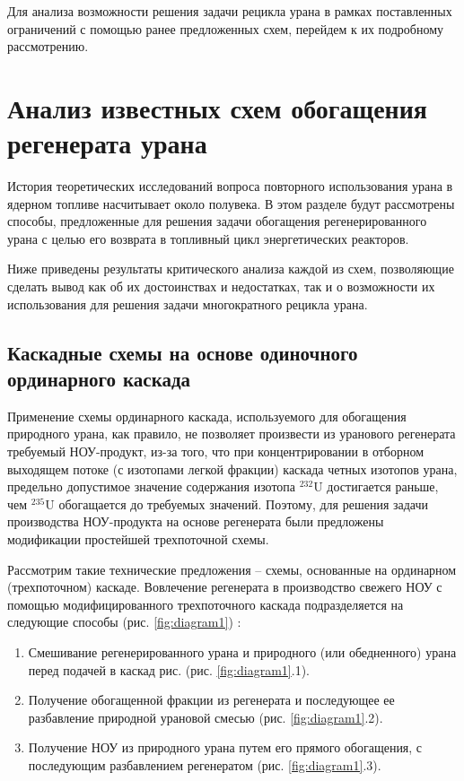 Для анализа возможности решения задачи рецикла урана в рамках поставленных ограничений с помощью ранее предложенных схем, перейдем к их подробному рассмотрению.

\section{Анализ известных схем обогащения регенерата урана}

История теоретических исследований вопроса повторного использования урана в ядерном топливе насчитывает около полувека.
В этом разделе будут рассмотрены способы, предложенные для решения задачи обогащения регенерированного урана с целью его возврата в топливный цикл энергетических реакторов.

Ниже приведены результаты критического анализа каждой из схем, позволяющие сделать вывод как об их достоинствах и недостатках, так и о возможности их использования для решения задачи многократного рецикла урана.

\subsection{Каскадные схемы на основе одиночного ординарного каскада}

Применение схемы ординарного каскада, используемого для обогащения природного урана, как правило, не позволяет произвести из уранового регенерата требуемый НОУ-продукт, из-за того, что при концентрировании в отборном выходящем потоке (с изотопами легкой фракции) каскада четных изотопов урана, предельно допустимое значение содержания изотопа $^{232}$U достигается раньше, чем $^{235}$U обогащается до требуемых значений. Поэтому, для решения задачи производства НОУ-продукта на основе регенерата были предложены модификации простейшей трехпоточной схемы.

Рассмотрим такие технические предложения -- схемы, основанные на ординарном (трехпоточном) каскаде.
Вовлечение регенерата в производство свежего НОУ с помощью модифицированного трехпоточного каскада подразделяется на следующие способы (рис. \ref{fig:diagram1}) \cite{sulaberidzeNekotoryhRazdelitelnyhProblemah2004,smirnovKaskadnyeShemyZadachah2012}:
\begin{enumerate}
  \item Смешивание регенерированного урана и природного (или обедненного) урана перед подачей в каскад рис. (рис. \ref{fig:diagram1}.1).
  \item Получение обогащенной фракции из регенерата и последующее ее разбавление природной урановой смесью (рис. \ref{fig:diagram1}.2).
  \item Получение НОУ из природного урана путем его прямого обогащения, с последующим разбавлением регенератом (рис. \ref{fig:diagram1}.3).
\end{enumerate}

